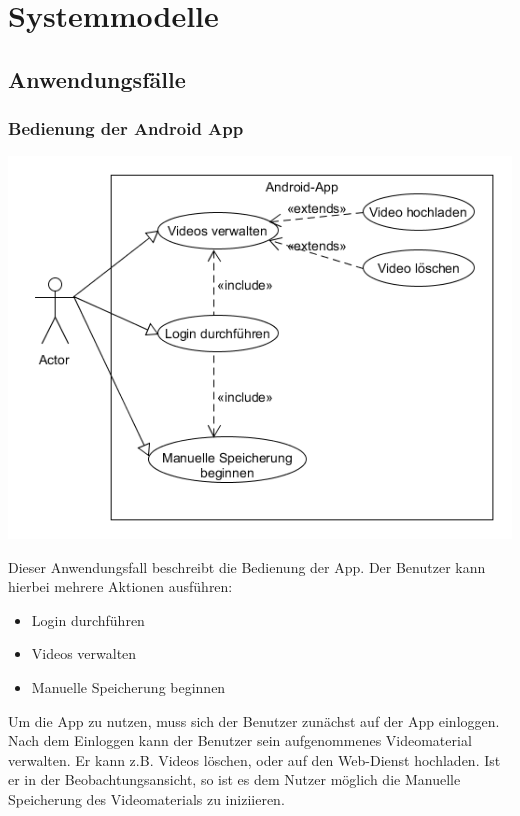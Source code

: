 \chapter{Systemmodelle}
\section{Anwendungsfälle}
\subsection{Bedienung der Android App}
\begin{center}
\includegraphics[width=1\textwidth]{subtopicsFuncspec/Res/systemModels/App-AFD-UML.png}
\end{center}
Dieser Anwendungsfall beschreibt die Bedienung der \gls{App}. 
Der Benutzer kann hierbei mehrere Aktionen ausführen:
\begin{itemize}
\itemsep0pt
\item Login durchführen
\item Videos verwalten
\item Manuelle Speicherung beginnen
\end{itemize}
Um die \gls{App} zu nutzen, muss sich der Benutzer zunächst auf der \gls{App} einloggen. Nach dem Einloggen kann der Benutzer sein aufgenommenes Videomaterial verwalten. Er kann z.B. Videos löschen, oder auf den \gls{Web-Dienst} hochladen.
Ist er in der Beobachtungsansicht, so ist es dem Nutzer möglich die Manuelle Speicherung des Videomaterials zu iniziieren.

